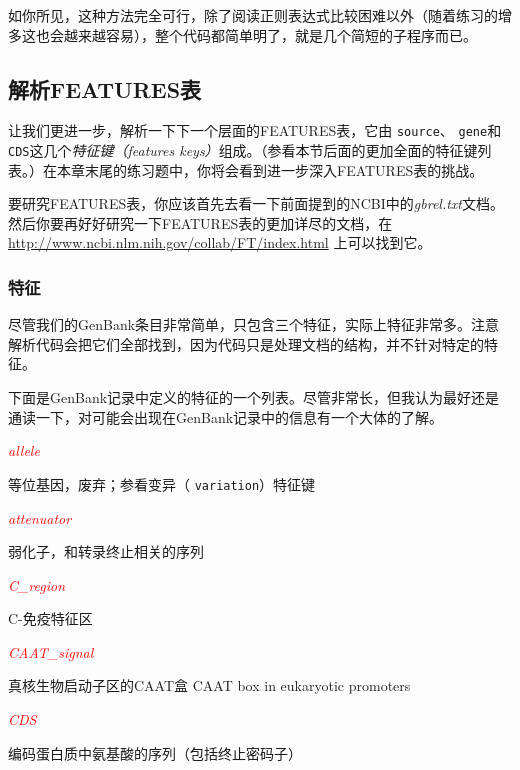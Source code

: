 如你所见，这种方法完全可行，除了阅读正则表达式比较困难以外（随着练习的增多这也会越来越容易），整个代码都简单明了，就是几个简短的子程序而已。

\subsection{解析FEATURES表}
让我们更进一步，解析一下下一个层面的FEATURES表，它由 \verb|source|、 \verb|gene|和 \verb|CDS|这几个\textit{特征键（features keys）}组成。（参看本节后面的更加全面的特征键列表。）在本章末尾的练习题中，你将会看到进一步深入FEATURES表的挑战。

要研究FEATURES表，你应该首先去看一下前面提到的NCBI中的\textit{gbrel.txt}文档。然后你要再好好研究一下FEATURES表的更加详尽的文档，在 \href{http://www.ncbi.nlm.nih.gov/collab/FT/index.html}{http://www.ncbi.nlm.nih.gov/collab/FT/index.html} 上可以找到它。

\subsubsection{特征}
尽管我们的GenBank条目非常简单，只包含三个特征，实际上特征非常多。注意解析代码会把它们全部找到，因为代码只是处理文档的结构，并不针对特定的特征。

下面是GenBank记录中定义的特征的一个列表。尽管非常长，但我认为最好还是通读一下，对可能会出现在GenBank记录中的信息有一个大体的了解。

\textcolor{red}{\textit{allele}}
\begin{adjustwidth}{4em}{}
等位基因，废弃；参看变异（ \verb|variation|）特征键
\end{adjustwidth}

\textcolor{red}{\textit{attenuator}}
\begin{adjustwidth}{4em}{}
弱化子，和转录终止相关的序列
\end{adjustwidth}

\textcolor{red}{\textit{C\_region}}
\begin{adjustwidth}{4em}{}
C-免疫特征区
\end{adjustwidth}

\textcolor{red}{\textit{CAAT\_signal}}
\begin{adjustwidth}{4em}{}
真核生物启动子区的CAAT盒
CAAT box in eukaryotic promoters
\end{adjustwidth}

\textcolor{red}{\textit{CDS}}
\begin{adjustwidth}{4em}{}
编码蛋白质中氨基酸的序列（包括终止密码子）
\end{adjustwidth}

